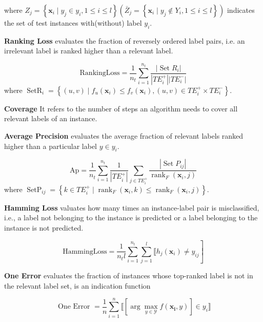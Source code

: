 \documentclass[final,3p,times]{elsarticle}
\begin{document}
\noindent where $Z_{j}=\left\{\mathbf{x}_{i} \mid y_{j} \in y_{i}, 1 \leq i \leq l\right\}\left(\bar{Z}_{j}=\left\{\mathbf{x}_{i} \mid y_{j} \notin Y_{i}, 1 \leq i \leq l\right\}\right)$ indicates the set of test instances with(without) label $y_i$.


\textbf{Ranking Loss} evaluates the fraction of reversely ordered label pairs, i.e. an irrelevant label is ranked higher than a relevant label.

\begin{equation}
	\mathrm{Ranking Loss}=\frac{1}{n_{t}} \sum_{i=1}^{n_{t}} \frac{\left|\operatorname{Set} R_{i}\right|}{\left|T E_{i}^{+}\right|\left|T E_{i}^{-}\right|}
\end{equation}
\noindent where $\operatorname{SetR}_{i}=\left\{(u, v) \mid f_{u}\left(\mathbf{x}_{i}\right) \leq f_{v}\left(\mathbf{x}_{i}\right),(u, v) \in T E_{i}^{+} \times T E_{i}^{-}\right\}$.

\textbf{Coverage} It refers to the number of steps an algorithm needs to cover all relevant labels of an instance.


\textbf{Average Precision} evaluates the average fraction of relevant labels ranked higher than a particular label $y \in y_{i}$.

\begin{equation}
	\mathrm{Ap}=\frac{1}{n_{t}} \sum_{i=1}^{n_{t}} \frac{1}{\left|T E_{i}^{+}\right|} \sum_{j \in T E_{i}^{+}} \frac{\left|\operatorname{Set} P_{i j}\right|}{\operatorname{rank}_{F}\left(\mathbf{x}_{i}, j\right)}
\end{equation}
\noindent where $\operatorname{SetP}_{i j}=\left\{k \in T E_{i}^{+} \mid \operatorname{rank}_{F}\left(\mathbf{x}_{i}, k\right) \leq \operatorname{rank}_{F}\left(\mathbf{x}_{i}, j\right)\right\}$.

\textbf{Hamming Loss} valuates how many times an instance-label pair is misclassified, i.e., a label not belonging to the instance is predicted or a label belonging to the instance is not predicted.

\begin{equation}
	\left.\mathrm{Hamming Loss}=\frac{1}{n_{t} l} \sum_{i=1}^{n_{t}} \sum_{j=1}^{l} \llbracket h_{j}\left(\mathbf{x}_{i}\right) \neq y_{i j}\right]
\end{equation}

\textbf{One Error} evaluates the fraction of instances whose top-ranked label is not in the relevant label set,  is an indication function

\begin{equation}
	\text { One Error }=\frac{1}{n} \sum_{i=1}^{n} \llbracket\left[\arg \max _{y \in \mathcal{Y}} f\left(\mathbf{x}_{\mathbf{i}}, y\right)\right] \in y_{i} \rrbracket
\end{equation}
\end{document}
